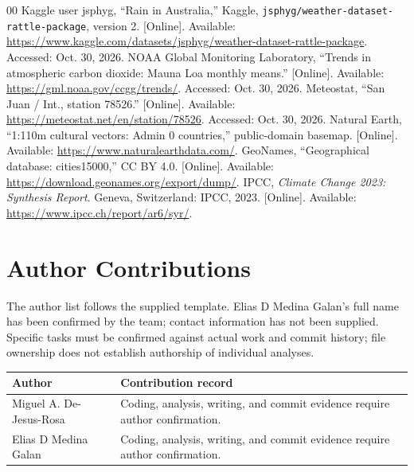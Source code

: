 \documentclass[conference]{IEEEtran}
\begin{document}
\begin{thebibliography}{00}
 Kaggle user jsphyg, ``Rain in Australia,'' Kaggle, \texttt{jsphyg/weather-dataset-rattle-package}, version 2. [Online]. Available: \url{https://www.kaggle.com/datasets/jsphyg/weather-dataset-rattle-package}. Accessed: Oct. 30, 2026.
 NOAA Global Monitoring Laboratory, ``Trends in atmospheric carbon dioxide: Mauna Loa monthly means.'' [Online]. Available: \url{https://gml.noaa.gov/ccgg/trends/}. Accessed: Oct. 30, 2026.
 Meteostat, ``San Juan / Int., station 78526.'' [Online]. Available: \url{https://meteostat.net/en/station/78526}. Accessed: Oct. 30, 2026.
 Natural Earth, ``1:110m cultural vectors: Admin 0 countries,'' public-domain basemap. [Online]. Available: \url{https://www.naturalearthdata.com/}.
 GeoNames, ``Geographical database: cities15000,'' CC BY 4.0. [Online]. Available: \url{https://download.geonames.org/export/dump/}.
 IPCC, \emph{Climate Change 2023: Synthesis Report}. Geneva, Switzerland: IPCC, 2023. [Online]. Available: \url{https://www.ipcc.ch/report/ar6/syr/}.
\end{thebibliography}

\section*{Author Contributions}
The author list follows the supplied template. Elias D Medina Galan's full name has been confirmed by the team; contact information has not been supplied. Specific tasks must be confirmed against actual work and commit history; file ownership does not establish authorship of individual analyses.
\begin{table}[h]\centering\footnotesize
\begin{tabular}{p{}p{}}
\toprule Author & Contribution record \\\midrule
Miguel A. De-Jesus-Rosa & Coding, analysis, writing, and commit evidence require author confirmation. \\
Elias D Medina Galan & Coding, analysis, writing, and commit evidence require author confirmation. \\\bottomrule
\end{tabular}\end{table}
\end{document}
